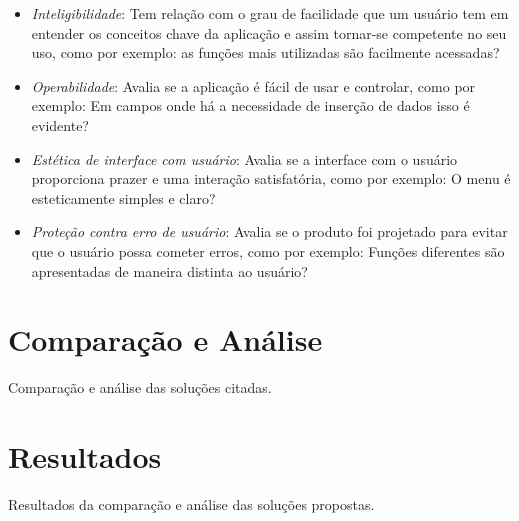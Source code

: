 \begin{itemize}
    \begin{itemize}
        \item \textit{Inteligibilidade}: Tem relação com o grau de facilidade que um usuário tem em entender os conceitos chave da aplicação e assim tornar-se competente no seu uso, como por exemplo: as funções mais utilizadas são facilmente acessadas?
        \item \textit{Operabilidade}: Avalia se a aplicação é fácil de usar e controlar, como por exemplo: Em campos onde há a necessidade de inserção de dados isso é evidente?
        \item \textit{Estética de interface com usuário}: Avalia se a interface com o usuário proporciona prazer e uma interação satisfatória, como por exemplo: O menu é esteticamente simples e claro?
        \item \textit{Proteção contra erro de usuário}: Avalia se o produto foi projetado para evitar que o usuário possa cometer erros, como por exemplo: Funções diferentes são apresentadas de maneira distinta ao usuário?
    \end{itemize}
\end{itemize}

\section{Comparação e Análise}
Comparação e análise das soluções citadas.

\section{Resultados}
Resultados da comparação e análise das soluções propostas.
